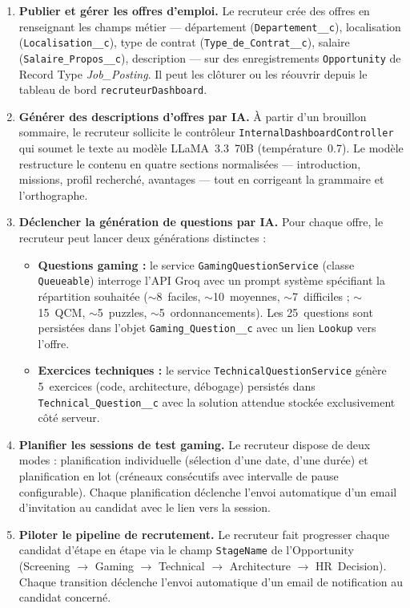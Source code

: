 \begin{enumerate}[label=\textbf{EF-R\arabic*}]
    \item \textbf{Publier et gérer les offres d'emploi.} Le recruteur crée des offres en renseignant les champs métier --- département (\texttt{Departement\_\_c}), localisation (\texttt{Localisation\_\_c}), type de contrat (\texttt{Type\_de\_Contrat\_\_c}), salaire (\texttt{Salaire\_Propos\_\_c}), description --- sur des enregistrements \texttt{Opportunity} de Record Type \textit{Job\_Posting}. Il peut les clôturer ou les réouvrir depuis le tableau de bord \texttt{recruteurDashboard}.
    
    \item \textbf{Générer des descriptions d'offres par IA.} À partir d'un brouillon sommaire, le recruteur sollicite le contrôleur \texttt{InternalDashboardController} qui soumet le texte au modèle LLaMA~3.3~70B (température~0.7). Le modèle restructure le contenu en quatre sections normalisées --- introduction, missions, profil recherché, avantages --- tout en corrigeant la grammaire et l'orthographe.
    
    \item \textbf{Déclencher la génération de questions par IA.} Pour chaque offre, le recruteur peut lancer deux générations distinctes :
    \begin{itemize}
        \item \textbf{Questions gaming :} le service \texttt{GamingQuestionService} (classe \texttt{Queueable}) interroge l'API Groq avec un prompt système spécifiant la répartition souhaitée ($\sim$8~faciles, $\sim$10~moyennes, $\sim$7~difficiles ; $\sim$15~QCM, $\sim$5~puzzles, $\sim$5~ordonnancements). Les 25~questions sont persistées dans l'objet \texttt{Gaming\_Question\_\_c} avec un lien \texttt{Lookup} vers l'offre.
        \item \textbf{Exercices techniques :} le service \texttt{TechnicalQuestionService} génère 5~exercices (code, architecture, débogage) persistés dans \texttt{Technical\_Question\_\_c} avec la solution attendue stockée exclusivement côté serveur.
    \end{itemize}
    
    \item \textbf{Planifier les sessions de test gaming.} Le recruteur dispose de deux modes : planification individuelle (sélection d'une date, d'une durée) et planification en lot (créneaux consécutifs avec intervalle de pause configurable). Chaque planification déclenche l'envoi automatique d'un email d'invitation au candidat avec le lien vers la session.
    
    \item \textbf{Piloter le pipeline de recrutement.} Le recruteur fait progresser chaque candidat d'étape en étape via le champ \texttt{StageName} de l'Opportunity (Screening $\rightarrow$ Gaming $\rightarrow$ Technical $\rightarrow$ Architecture $\rightarrow$ HR~Decision). Chaque transition déclenche l'envoi automatique d'un email de notification au candidat concerné.
\end{enumerate}


